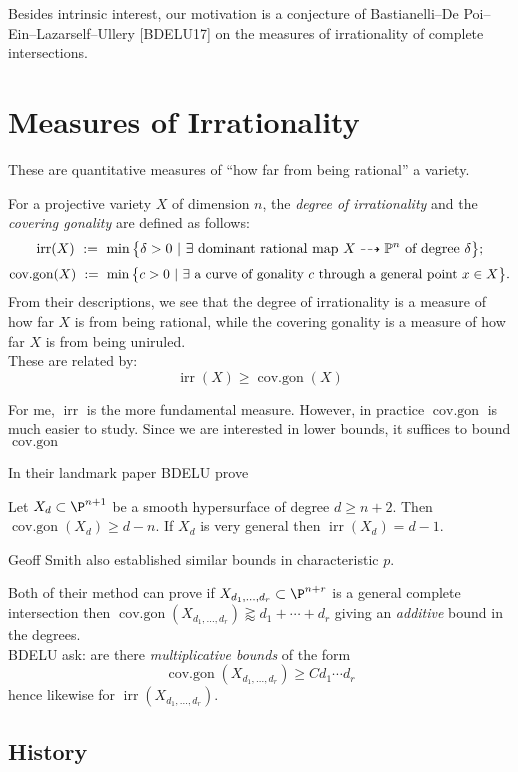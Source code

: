 \documentclass[12pt]{article}
\theoremstyle{plain}
\DeclareMathOperator{\irr}{irr}
\DeclareMathOperator{\cov}{cov.gon}
\newcommand{\mb}[1]{\mathbb{#1}}
\DeclareMathOperator{\cg}{cov.gon}
\DeclareMathOperator{\covgon}{cov.gon}
\begin{document}
{\color{red} Besides intrinsic interest, our motivation is a conjecture of Bastianelli--De Poi--Ein--Lazarself--Ullery [BDELU17] on the measures of irrationality of complete intersections.}

\section{Measures of Irrationality}

{\color{red} These are quantitative measures of ``how far from being rational'' a variety. }

For a projective variety $X$ of dimension $n$, the \emph{degree of irrationality} and the \emph{covering gonality} are defined as follows:
\[ \irr(X)\ :=\ \min\big\{\delta>0\ |\ \exists\textup{ dominant rational map } X\dashrightarrow \mb{P}^n\textup{ of degree }\delta\big\}; \]
\[ \cov(X)\ :=\ \min\big\{c>0\ |\ \exists\textup{ a curve of gonality } c \textup{ through a general point } x\in X\big\}.\]
{\color{red} From their descriptions, we see that the degree of irrationality is a measure of how far $X$ is from being rational, while the covering gonality is a measure of how far $X$ is from being uniruled.} 
\bigskip\\
These are related by: 
\[ \irr(X) \geq \cg(X) \]

{\color{red} For me, $\irr$ is the more fundamental measure. However, in practice $\cg$ is much easier to study. Since we are interested in lower bounds, it suffices to bound $\cg$}

In their landmark paper BDELU prove 

\begin{theorem}[BDELU, '17]
Let $X_d \subset \P^{n+1}$ be a smooth hypersurface of degree $d \ge n + 2$. Then $\covgon(X_d) \ge d - n$. If $X_d$ is very general then $\irr(X_d) = d - 1$. 
\end{theorem}

{\color{red} Geoff Smith also established similar bounds in characteristic $p$.} 

Both of their method can prove if $X_{d_1, \dots, d_r} \subset \P^{n+r}$ is a general complete intersection then $\cg(X_{d_1, \dots, d_r}) \gtrapprox d_1 + \cdots + d_r$ giving an \textit{additive} bound in the degrees. 
\bigskip\\
BDELU ask: are there \textit{multiplicative bounds} of the form
\[ \cg(X_{d_1, \dots, d_r}) \ge C d_1 \cdots d_r \]
hence likewise for $\irr(X_{d_1, \dots, d_r})$.

\subsection{History}
\end{document}
